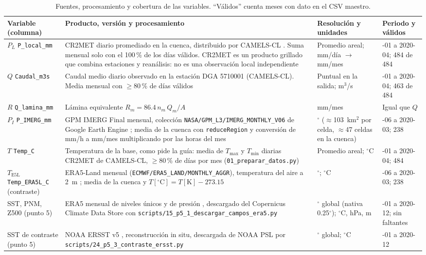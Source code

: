 \documentclass[11pt,a4paper]{article}
\newcommand{\archivo}[1]{\nolinkurl{#1}}
\newcommand{\PL}{P_L}
\newcommand{\PI}{P_I}
\newcommand{\Qm}{Q}
\begin{document}
\begin{table}[H]
\centering\footnotesize
\caption{Fuentes, procesamiento y cobertura de las variables. ``Válidos'' cuenta meses con dato en el CSV maestro.}
\label{tab:fuentes}
\begin{tabularx}{\textwidth}{>{\raggedright\arraybackslash}p{1.9cm}>{\raggedright\arraybackslash}X>{\raggedright\arraybackslash}p{3.3cm}>{\raggedright\arraybackslash}p{2.6cm}}
\toprule
Variable (columna) & Producto, versión y procesamiento & Resolución y unidades & Periodo y válidos \\
\midrule
$\PL$ \texttt{P\_local\_mm} & CR2MET diario promediado en la cuenca, distribuido por CAMELS-CL \citep{AlvarezGarreton2018}. Suma mensual solo con el 100\,\% de los días válidos. CR2MET es un producto grillado que combina estaciones y reanálisis: no es una observación local independiente & Promedio areal; mm/día $\rightarrow$ mm/mes & 1980-01 a 2020-04; 484 de 484 \\
$\Qm$ \texttt{Caudal\_m3s} & Caudal medio diario observado en la estación DGA 5710001 (CAMELS-CL). Media mensual con $\geq80$\,\% de días válidos & Puntual en la salida; m$^3$/s & 1980-01 a 2020-04; 463 de 484 \\
$R$ \texttt{Q\_lamina\_mm} & Lámina equivalente $R_m=86.4\,n_m\,Q_m/A$ & mm/mes & Igual que $\Qm$ \\
$\PI$ \texttt{P\_IMERG\_mm} & GPM IMERG Final mensual, colección \texttt{NASA/GPM\_L3/IMERG\_MONTHLY\_V06} de Google Earth Engine \citep{IMERGV06,Huffman2020}; media de la cuenca con \texttt{reduceRegion} y conversión de mm/h a mm/mes multiplicando por las horas del mes & 0.1$^\circ$ ($\approx$103~km$^2$ por celda, $\approx$47 celdas en la cuenca) & 2000-06 a 2020-03; 238 \\
$T$ \texttt{Temp\_C} & Temperatura de la base, como pide la guía: media de $T_{\max}$ y $T_{\min}$ diarias CR2MET de CAMELS-CL, $\geq80$\,\% de días por mes (\archivo{01_preparar_datos.py}) & Promedio areal; $^\circ$C & 1980-01 a 2020-04; 484 \\
$T_{\mathrm{E5L}}$ \texttt{Temp\_ERA5L\_C} (contraste) & ERA5-Land mensual (\texttt{ECMWF/ERA5\_LAND/MONTHLY\_AGGR}), temperatura del aire a 2~m \citep{MunozSabater2021}; media de la cuenca y $T[^\circ\mathrm{C}]=T[\mathrm{K}]-273.15$ & 0.1$^\circ$; $^\circ$C & 2000-06 a 2020-03; 238 \\
SST, PNM, Z500 (punto 5) & ERA5 mensual de niveles únicos y de presión \citep{Hersbach2020,ERA5single,ERA5pressure}, descargado del Copernicus Climate Data Store con \archivo{scripts/15_p5_1_descargar_campos_era5.py} & 1$^\circ$ global (nativa 0.25$^\circ$); $^\circ$C, hPa, m & 1979-01 a 2020-12; sin faltantes \\
SST de contraste (punto 5) & NOAA ERSST v5 \citep{Huang2017}, reconstrucción in situ, descargada de NOAA PSL por \archivo{scripts/24_p5_3_contraste_ersst.py} & 2$^\circ$ global; $^\circ$C & 1979-01 a 2020-12 \\
\bottomrule
\end{tabularx}
\end{table}
\end{document}
